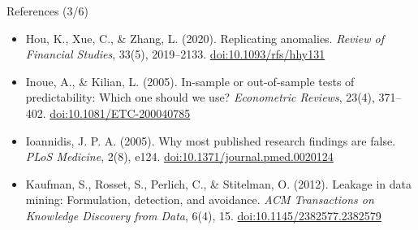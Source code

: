 \begin{frame}{References (3/6)}
\begin{itemize}
    \item Hou, K., Xue, C., \& Zhang, L. (2020). Replicating anomalies. \textit{Review of Financial Studies}, 33(5), 2019--2133. \href{https://doi.org/10.1093/rfs/hhy131}{doi:10.1093/rfs/hhy131}
    \item Inoue, A., \& Kilian, L. (2005). In-sample or out-of-sample tests of predictability: Which one should we use? \textit{Econometric Reviews}, 23(4), 371--402. \href{https://doi.org/10.1081/ETC-200040785}{doi:10.1081/ETC-200040785}
    \item Ioannidis, J. P. A. (2005). Why most published research findings are false. \textit{PLoS Medicine}, 2(8), e124. \href{https://doi.org/10.1371/journal.pmed.0020124}{doi:10.1371/journal.pmed.0020124}
    \item Kaufman, S., Rosset, S., Perlich, C., \& Stitelman, O. (2012). Leakage in data mining: Formulation, detection, and avoidance. \textit{ACM Transactions on Knowledge Discovery from Data}, 6(4), 15. \href{https://doi.org/10.1145/2382577.2382579}{doi:10.1145/2382577.2382579}
\end{itemize}
\end{frame}

